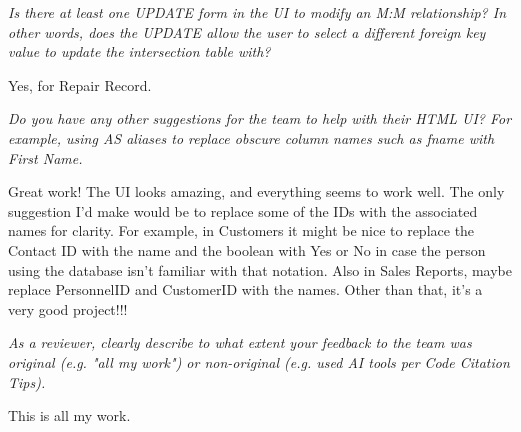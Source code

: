 \documentclass{article}
\begin{document}
\begin{tcolorbox}[colback=secondarycolor, colframe=primarycolor, title=\textbf{Step 3: Peer Review 1 - Scott Dispensa}]
\vspace{0.2cm}
\textit{Is there at least one UPDATE form in the UI to modify an M:M relationship? In other words, does the UPDATE allow the user to select a different foreign key value to update the intersection table with?}

\vspace{0.05cm}
Yes, for Repair Record.

\vspace{0.2cm}
\textit{Do you have any other suggestions for the team to help with their HTML UI? For example, using AS aliases to replace obscure column names such as fname with First Name.}

\vspace{0.05cm}
Great work! The UI looks amazing, and everything seems to work well. The only suggestion I'd make would be to replace some of the IDs with the associated names for clarity. For example, in Customers it might be nice to replace the Contact ID with the name and the boolean with Yes or No in case the person using the database isn't familiar with that notation. Also in Sales Reports, maybe replace PersonnelID and CustomerID with the names. Other than that, it's a very good project!!!

\vspace{0.2cm}
\textit{As a reviewer, clearly describe to what extent your feedback to the team was original (e.g. "all my work") or non-original (e.g. used AI tools per Code Citation Tips). }

\vspace{0.05cm}
This is all my work.

\end{tcolorbox}

\vspace{0.2cm}
\end{document}
